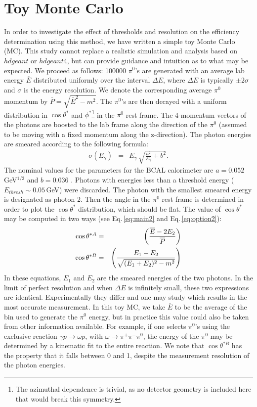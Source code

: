 \documentclass[12pt]{article}
\begin{document}
\section{Toy Monte Carlo}
In order to investigate the effect of thresholds and resolution on the efficiency determination using this method, we have written a simple toy Monte Carlo (MC). This study cannot replace a realistic simulation
and analysis based on $hdgeant$ or $hdgeant4$, but can provide guidance and intuition as to what may be expected. We proceed as follows: 100000 $\pi^0$'s are generated 
with an average lab energy $\overline{E}$ distributed uniformly over the interval $\Delta E$, where $\Delta E$ is typically $\pm 2 \sigma$ and $\sigma$ is the energy resolution. We denote the corresponding
average $\pi^0$ momentum by $\overline{P} = \sqrt{\overline{E}^2 - m^2}$. The $\pi^0$'s are then 
decayed with a  uniform distribution in $\cos{\theta^*}$  and $\phi^*$\footnote{The azimuthal dependence is trivial, as no detector geometry is included here that would break this symmetry.} in the $\pi^0$ rest frame.
The 4-momentum vectors of the photons are boosted to the lab frame along the direction of the $\pi^0$ (assumed to be moving with a fixed momentum along the z-direction). The photon
energies are smeared according to the following formula:
\begin{eqnarray}
\sigma(E_\gamma) & = & E_\gamma\, \sqrt{\frac{a^2}{E_\gamma} + b ^2}.
\end{eqnarray}
The nominal values for the parameters for the BCAL calorimeter are $a=0.052$\,GeV$^{1/2}$ and $b=0.036$ \cite{BEATTIE201824}. Photons with energies less than a threshold energy 
($E_{thresh} \sim 0.05$\,GeV) were discarded. The photon with the smallest smeared energy is designated as photon 2. Then the angle in the $\pi^0$ rest frame is determined
in order to plot the $\cos{\theta^*}$ distribution, which should be flat. The value of $\cos{\theta}^*$ may be computed in two ways  (see Eq.\,\ref{eq:main2} and Eq.\,\ref{eq:option2}):
\begin{eqnarray}
\cos{\theta^{*A}} & = & \left( {\overline{E} - 2E_2 \over \overline{P}} \right) \label{eq:optionA} \\
\cos{\theta^{*B}} & = & \left( {E_1 - E_2} \over \sqrt{ (E_1+E_2)^2 - m^2} \right) \label{eq:optionB}
\end{eqnarray}
In these equations, $E_1$ and $E_2$ are the smeared energies of the two photons.
In the limit of perfect resolution and when $\Delta E$ is infinitely small, these two expressions are identical. Experimentally they differ and one may study which results in the most accurate measurement.  In this 
toy MC, we take $\overline{E}$ to be the average of the bin used to generate the $\pi^0$ energy, but in practice this value could also be taken from other information available. For example, if one selects
$\pi^0$'s using the exclusive reaction $\gamma p \rightarrow \omega p$, with $\omega \rightarrow \pi^+\pi^-\pi^0$, the energy of the $\pi^0$ may be determined by a kinematic fit to the entire reaction. We note
that $\cos{\theta^{*B}}$ has the property that it falls between 0 and 1, despite the measurement resolution of the photon energies.
\end{document}
